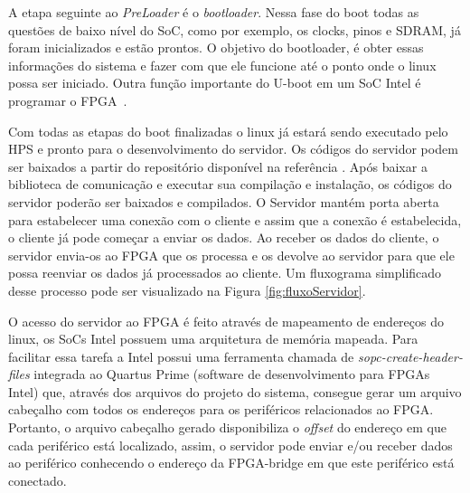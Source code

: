 A etapa seguinte ao \textit{PreLoader} é o \textit{bootloader}. Nessa fase do boot todas as questões de baixo nível do SoC, como por exemplo, os clocks, pinos e SDRAM, já foram inicializados e estão prontos. O objetivo do bootloader, é obter essas informações do sistema e fazer com que ele funcione até o ponto onde o linux possa ser iniciado. Outra função importante do U-boot em um SoC Intel é programar o FPGA~\cite{SocLinux}.

Com todas as etapas do boot finalizadas o linux já estará sendo executado pelo HPS e pronto para o desenvolvimento do servidor. Os códigos do servidor podem ser baixados a partir do repositório disponível na referência \cite{interface-socket-server}. Após baixar a biblioteca de comunicação \cite{Pereira-Neto-Biblioteca} e executar sua compilação e instalação, os códigos do servidor poderão ser baixados e compilados. O Servidor mantém porta aberta para estabelecer uma conexão com o cliente e assim que a conexão é estabelecida, o cliente já pode começar a enviar os dados. Ao receber os dados do cliente, o servidor envia-os ao FPGA que os processa e os devolve ao servidor para que ele possa reenviar os dados já processados ao cliente. Um fluxograma simplificado desse processo pode ser visualizado na Figura \ref{fig:fluxoServidor}.

O acesso do servidor ao FPGA é feito através de mapeamento de endereços do linux, os SoCs Intel possuem uma arquitetura de memória mapeada. Para facilitar essa tarefa a Intel possui uma ferramenta chamada de \textit{sopc-create-header-files} integrada ao Quartus Prime (software de desenvolvimento para FPGAs Intel) que, através dos arquivos do projeto do sistema, consegue gerar um arquivo cabeçalho com todos os endereços para os periféricos relacionados ao FPGA\@. Portanto, o arquivo cabeçalho gerado disponibiliza o \textit{offset} do endereço em que cada periférico está localizado, assim, o servidor pode enviar e/ou receber dados ao periférico conhecendo o endereço da FPGA-bridge em que este periférico está conectado.


